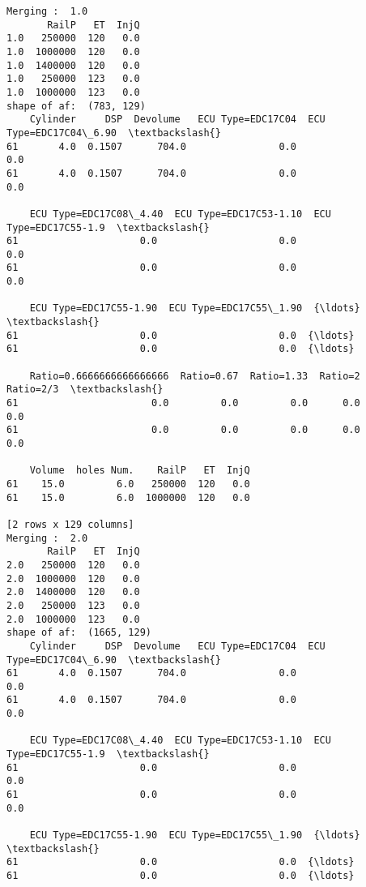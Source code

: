 \documentclass[11pt]{article}
\begin{document}
    \begin{Verbatim}[commandchars=\\\{\}]
Merging :  1.0
       RailP   ET  InjQ
1.0   250000  120   0.0
1.0  1000000  120   0.0
1.0  1400000  120   0.0
1.0   250000  123   0.0
1.0  1000000  123   0.0
shape of af:  (783, 129)
    Cylinder     DSP  Devolume   ECU Type=EDC17C04  ECU Type=EDC17C04\_6.90  \textbackslash{}
61       4.0  0.1507      704.0                0.0                     0.0   
61       4.0  0.1507      704.0                0.0                     0.0   

    ECU Type=EDC17C08\_4.40  ECU Type=EDC17C53-1.10  ECU Type=EDC17C55-1.9  \textbackslash{}
61                     0.0                     0.0                    0.0   
61                     0.0                     0.0                    0.0   

    ECU Type=EDC17C55-1.90  ECU Type=EDC17C55\_1.90  {\ldots}   \textbackslash{}
61                     0.0                     0.0  {\ldots}    
61                     0.0                     0.0  {\ldots}    

    Ratio=0.6666666666666666  Ratio=0.67  Ratio=1.33  Ratio=2  Ratio=2/3  \textbackslash{}
61                       0.0         0.0         0.0      0.0        0.0   
61                       0.0         0.0         0.0      0.0        0.0   

    Volume  holes Num.    RailP   ET  InjQ  
61    15.0         6.0   250000  120   0.0  
61    15.0         6.0  1000000  120   0.0  

[2 rows x 129 columns]
Merging :  2.0
       RailP   ET  InjQ
2.0   250000  120   0.0
2.0  1000000  120   0.0
2.0  1400000  120   0.0
2.0   250000  123   0.0
2.0  1000000  123   0.0
shape of af:  (1665, 129)
    Cylinder     DSP  Devolume   ECU Type=EDC17C04  ECU Type=EDC17C04\_6.90  \textbackslash{}
61       4.0  0.1507      704.0                0.0                     0.0   
61       4.0  0.1507      704.0                0.0                     0.0   

    ECU Type=EDC17C08\_4.40  ECU Type=EDC17C53-1.10  ECU Type=EDC17C55-1.9  \textbackslash{}
61                     0.0                     0.0                    0.0   
61                     0.0                     0.0                    0.0   

    ECU Type=EDC17C55-1.90  ECU Type=EDC17C55\_1.90  {\ldots}   \textbackslash{}
61                     0.0                     0.0  {\ldots}    
61                     0.0                     0.0  {\ldots}    


\end{Verbatim}
\end{document}
